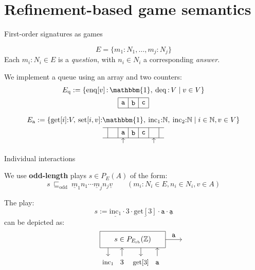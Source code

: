 \documentclass[aspectratio=54]{beamer}
\newcommand{\kw}[1]{\ensuremath{ \mathrm{#1} }}
\newcommand{\deqpic}[3]{%
  \begin{tikzpicture}[scale=0.4]
    \draw (-4,-1) rectangle (4,1);
    \node (x) at (0,0) {$#1$};
    \draw[->] (-3, -1) -- (-3, -2);
    \node[anchor=base] at (-3, -3) {\small $\kw{inc}_1$};
    \draw[<-] (-1.3, -1) -- (-1.3, -2);
    \node[anchor=base] at (-1.3, -3) {$#2$};
    \draw[->] (1, -1) -- (1, -2);
    \node[anchor=base] at (1, -3) {\small $\kw{get}[#2]$};
    \draw[<-] (3, -1) -- (3, -2);
    \node[anchor=base] at (3, -3) {$#3$};
    \draw[->] (4,0) -- node[above] {$#3$} (6,0);
  \end{tikzpicture}%
}
\begin{document}

\section{Refinement-based game semantics} %

\begin{frame}{First-order signatures as games} %
  \begin{definition}[Signature]
  \[
    E = \{ m_1 \mathop{:} N_1, \ldots, m_j \mathop{:} N_j \}
  \]
  Each $m_i \mathop{:} N_i \in E$ is a \emph{question},
  with $n_i \in N_i$ a corresponding \emph{answer}.
  \end{definition}
  \pause
  \begin{example}
    We implement a queue using an array and two counters:
    \begin{gather*}
      E_\kw{q} := \{
        \kw{enq}[v] \mathop{:} \mathbbm{1}, \:
        \kw{deq} \mathop{:} V \mid
        v \in V \}
      \\
      \begin{tikzpicture}[scale=0.5]
        \draw (0,0) grid (3,1);
        \node at (0.5,0.5) {$\mathtt{a}$};
        \node at (1.5,0.5) {$\mathtt{b}$};
        \node at (2.5,0.5) {$\mathtt{c}$};
      \end{tikzpicture}
      \\[1ex]
      E_\kw{a} := \{
        \kw{get}[i] {:} V, \:
        \kw{set}[i,v] {:} \mathbbm{1}, \:
        \kw{inc}_1 {:} \mathbb{N}, \:
        \kw{inc}_2 {:} \mathbb{N}
        \mid i \in \mathbb{N}, v \in V \} \\
      \begin{tikzpicture}[scale=0.5]
        \draw (-0.5,0) grid (5.5,1);
        \node at (1.5,0.5) {$\mathtt{a}$};
        \node at (2.5,0.5) {$\mathtt{b}$};
        \node at (3.5,0.5) {$\mathtt{c}$};
        \draw[->] (1.5,-0.5) -- (1.5,0);
        \draw[->] (4.5,-0.5) -- (4.5,0);
      \end{tikzpicture}
    \end{gather*}
  \end{example}
\end{frame}

\begin{frame}{Individual interactions} %
\begin{definition}[Plays]
We use \textbf{odd-length} plays $s \in P_E(A)$ of the form:
\[
  s \: \sqsubseteq_\kw{odd} \:
    \underline{m}_1 n_1
    \cdots
    \underline{m}_j n_j
    \underline{v}
  \qquad
  (m_i \mathop{:} N_i \in E, n_i \in N_i, v \in A)
\]
\end{definition}
\pause
\begin{example}
  The play:
  \[
    s :=
    \underline{\kw{inc}_1} \cdot 3 \cdot
    \underline{\kw{get}[3]} \cdot \mathtt{a} \cdot
    \underline{\mathtt{a}}
  \]
  can be depicted as:
  \[
    \qquad
    \deqpic{s \in {P}_{E_\kw{rb}}(\mathbb{Z})}{3}{\mathtt{a}}
  \]
\end{example}
\end{frame}
\end{document}
